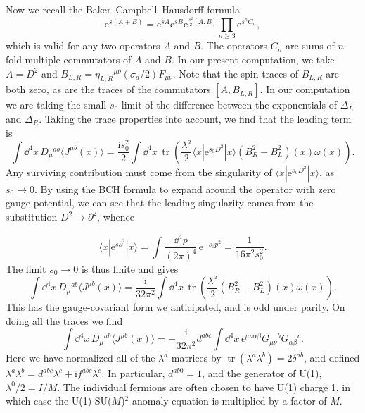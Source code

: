 Now we recall the Baker--Campbell--Hausdorff formula
\[
  \mathrm{e}^{s(A+B)}=\mathrm{e}^{sA}\mathrm{e}^{sB}
  \mathrm{e}^{\frac{s^2}{2}[A,B]}
  \prod_{n\geq3}\mathrm{e}^{s^n C_n},
\]
which is valid for any two operators $A$ and $B$. The operators $C_n$ are
sums of $n$-fold multiple commutators of $A$ and $B$. In our present
computation, we take $A=D^2$ and
$B_{L,R}=\eta_{L,R}{}^{\mu\nu}(\sigma_a/2)F_{\mu\nu}$. Note that the spin
traces of $B_{L,R}$ are both zero, as are the traces of the commutators
$[A,B_{L,R}]$. In our computation we are taking the small-$s_0$ limit of the
difference between the exponentials of $\Delta_L$ and $\Delta_R$. Taking the
trace properties into account, we find that the leading term is
\[
  \int\!\dd^4x\,D_\mu{}^{ab}\langle J^{\mu b}(x)\rangle
  =\frac{\mathrm{i}s_0^2}{2}\int\!\dd^4x\,
  \operatorname{tr}\left(\frac{\lambda^a}{2}
  \langle x|\mathrm{e}^{s_0D^2}|x\rangle
  (B_R^2-B_L^2)(x)\omega(x)\right).
\]
Any surviving contribution must come from the singularity of
$\langle x|\mathrm{e}^{s_0D^2}|x\rangle$, as $s_0\to0$. By using the BCH
formula to expand around the operator with zero gauge potential, we can see
that the leading singularity comes from the substitution $D^2\to\partial^2$,
whence

\[
  \langle x|\mathrm{e}^{s\partial^2}|x\rangle
  =\int\frac{\dd^4p}{(2\pi)^4}\,\mathrm{e}^{-s_0p^2}
  =\frac{1}{16\pi^2s_0^2} .
\]
The limit $s_0\to0$ is thus finite and gives
\[
  \int\!\dd^4x\,D_\mu{}^{ab}\langle J^{\mu b}(x)\rangle
  =\frac{\mathrm{i}}{32\pi^2}\int\!\dd^4x\,
  \operatorname{tr}\left(\frac{\lambda^a}{2}(B_R^2-B_L^2)(x)\omega(x)\right).
\]
This has the gauge-covariant form we anticipated, and is odd under parity. On
doing all the traces we find
\[
  \int\!\dd^4x\,D_\mu{}^{ab}\langle J^{\mu b}(x)\rangle
  =-\frac{\mathrm{i}}{32\pi^2}d^{abc}\int\!\dd^4x\,
  \epsilon^{\mu\nu\alpha\beta}G_{\mu\nu}{}^bG_{\alpha\beta}{}^c .
\]
Here we have normalized all of the $\lambda^a$ matrices by
$\operatorname{tr}(\lambda^a\lambda^b)=2\delta^{ab}$, and defined
$\lambda^a\lambda^b=d^{abc}\lambda^c+\mathrm{i}f^{abc}\lambda^c$. In
particular, $d^{ab0}=1$, and the generator of U(1), $\lambda^0/2=I/M$.
The individual fermions are often chosen to have U(1) charge 1, in which case
the U(1) SU($M$)$^2$ anomaly equation is multiplied by a factor of $M$.

